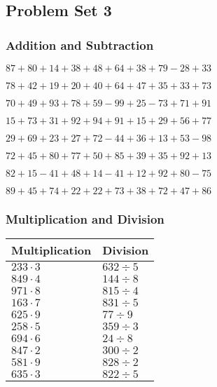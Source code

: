 \hypertarget{problem-set-3}{%
\subsection{Problem Set 3}\label{problem-set-3}}

\hypertarget{addition-and-subtraction}{%
\subsubsection{Addition and
Subtraction}\label{addition-and-subtraction}}

\(87+80+14+38+48+64+38+79-28+33\)

\(78+42+19+20+40+64+47+35+33+73\)

\(70+49+93+78+59-99+25-73+71+91\)

\(15+73+31+92+94+91+15+29+56+77\)

\(29+69+23+27+72-44+36+13+53-98\)

\(72+45+80+77+50+85+39+35+92+13\)

\(82+15-41+48+14-41+12+92+80-75\)

\(89+45+74+22+22+73+38+72+47+86\)

\hypertarget{multiplication-and-division}{%
\subsubsection{Multiplication and
Division}\label{multiplication-and-division}}

\begin{longtable}[]{@{}ll@{}}
\toprule
Multiplication & Division\tabularnewline
\midrule
\endhead
\(233\cdot3\) & \(632÷5\)\tabularnewline
\(849\cdot4\) & \(144÷8\)\tabularnewline
\(971\cdot8\) & \(815÷4\)\tabularnewline
\(163\cdot7\) & \(831÷5\)\tabularnewline
\(625\cdot9\) & \(77÷9\)\tabularnewline
\(258\cdot5\) & \(359÷3\)\tabularnewline
\(694\cdot6\) & \(24÷8\)\tabularnewline
\(847\cdot2\) & \(300÷2\)\tabularnewline
\(581\cdot9\) & \(828÷2\)\tabularnewline
\(635\cdot3\) & \(822÷5\)\tabularnewline
\bottomrule
\end{longtable}
